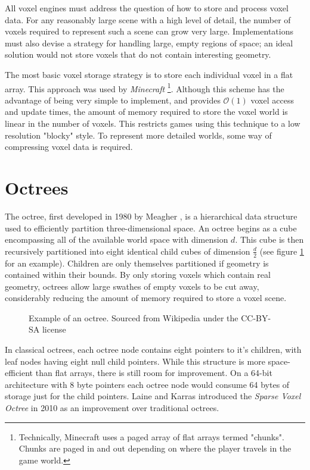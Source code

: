 All voxel engines must address the question of how to store and process voxel data. For any reasonably large scene with a high level of detail, the number of voxels required to represent such a scene can grow very large. Implementations must also devise a strategy for handling large, empty regions of space; an ideal solution would not store voxels that do not contain interesting geometry.

The most basic voxel storage strategy is to store each individual voxel in a flat array. This approach was used by \textit{Minecraft} \autocite{minecraftchunkformat} \footnote{Technically, Minecraft uses a paged array of flat arrays termed "chunks". Chunks are paged in and out depending on where the player travels in the game world.}. Although this scheme has the advantage of being very simple to implement, and provides $\mathcal{O}(1)$ voxel access and update times, the amount of memory required to store the voxel world is linear in the number of voxels. This restricts games using this technique to a low resolution "blocky" style. To represent more detailed worlds, some way of compressing voxel data is required.

\section{Octrees}
The octree, first developed in 1980 by Meagher \autocite{meagher1980octree}, is a hierarchical data structure used to efficiently partition three-dimensional space. An octree begins as a cube encompassing all of the available world space with dimension $d$. This cube is then recursively partitioned into eight identical child cubes of dimension $\frac{d}{2}$ (see figure \ref{fig:octree_example} for an example). Children are only themselves partitioned if geometry is contained within their bounds. By only storing voxels which contain real geometry, octrees allow large swathes of empty voxels to be cut away, considerably reducing the amount of memory required to store a voxel scene.

\begin{figure}[ht]
    \centering
    
    \caption{Example of an octree. Sourced from Wikipedia under the CC-BY-SA license}
    \label{fig:octree_example}
\end{figure}

In classical octrees, each octree node contains eight pointers to it's children, with leaf nodes having eight null child pointers. While this structure is more space-efficient than flat arrays, there is still room for improvement. On a 64-bit architecture with 8 byte pointers each octree node would consume 64 bytes of storage just for the child pointers. Laine and Karras introduced the \textit{Sparse Voxel Octree} in 2010 \autocite{laine2010efficient} as an improvement over traditional octrees.

